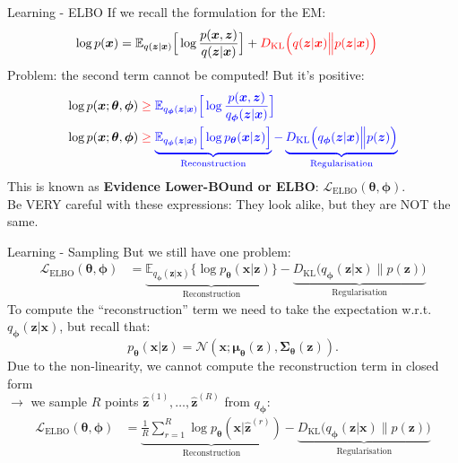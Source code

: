 \documentclass[aspectratio=169]{beamer}
\newcommand{\bs}[1]{\boldsymbol{#1}}
\begin{document}
\begin{frame}{Learning - ELBO}
 If we recall the formulation for the EM:
 \begin{align*}
\log p(\bs{x}) &= \mathbb{E}_{q(\bs{z}|\bs{x})}\Big[\log \frac{p(\bs{x},\bs{z})}{q(\bs{z}|\bs{x})}\Big] + {\color{red} D_{\text{KL}}\Big(q(\bs{z}|\bs{x})\Big\lVert p(\bs{z}|\bs{x})\Big)}
\end{align*}\pause
Problem: the second term cannot be computed! But it's positive:
 \begin{align*}
\log p(\bs{x};\bs{\theta},\bs{\phi}) &\; {\color{red}\geq}\; {\color{blue} \mathbb{E}_{q_{\bs{\phi}}(\bs{z}|\bs{x})}\Big[\log \frac{p(\bs{x},\bs{z})}{q_{\bs{\phi}}(\bs{z}|\bs{x})}\Big]} \\
\log p(\bs{x};\bs{\theta},\bs{\phi}) &\; {\color{red}\geq}\; {\color{blue} \underbrace{\mathbb{E}_{q_{\bs{\phi}}(\bs{z}|\bs{x})}\Big[\log p_{\bs{\theta}}(\bs{x}|\bs{z})\Big]}_{\text{Reconstruction}} -  \underbrace{D_{\text{KL}}\Big(q_{\bs{\phi}}(\bs{z}|\bs{x})\Big\lVert p(\bs{z})\Big)}_{\text{Regularisation}}}
\end{align*}
This is known as \textbf{Evidence Lower-BOund or ELBO}: $\mathcal{L}_{\text{ELBO}}(\bs{\theta},\bs{\phi})$.\vspace{3mm}\\
Be VERY careful with these expressions: They look alike, but they are NOT the same.
\end{frame}

\begin{frame}{Learning - Sampling}
 But we still have one problem:
 \begin{align*}
  \mathcal{L}_{\text{ELBO}}(\bs{\theta},\bs{\phi}) &= \underbrace{\mathbb{E}_{q_{\bs{\phi}}(\bs{z}|\bs{x})}\Big\{\log p_{\bs{\theta}}(\bs{x}|\bs{z})\Big\}}_{\text{Reconstruction}} -  \underbrace{D_{\text{KL}}\Big(q_{\bs{\phi}}(\bs{z}|\bs{x})\Big\lVert p(\bs{z})\Big)}_{\text{Regularisation}}
\end{align*}
To compute the ``reconstruction'' term we need to take the expectation w.r.t.\ $q_{\bs{\phi}}(\bs{z}|\bs{x})$, but recall that:
\begin{equation*}
  p_{\bs{\theta}}(\bs{x}|\bs{z}) = \mathcal{N}(\bs{x};\bs{\mu}_{\bs{\theta}}(\bs{z}),\bs{\Sigma}_{\bs{\theta}}(\bs{z})).
\end{equation*}
Due to the non-linearity, we cannot compute the reconstruction term in closed form\\ $\rightarrow$ we sample $R$ points $\hat{\bs{z}}^{(1)},\ldots,\hat{\bs{z}}^{(R)}$ from $q_{\bs{\phi}}$:
 \begin{align*}
  \mathcal{L}_{\text{ELBO}}(\bs{\theta},\bs{\phi}) &= \underbrace{\frac{1}{R}\sum_{r=1}^R\log p_{\bs{\theta}}(\bs{x}|\hat{\bs{z}}^{(r)})}_{\text{Reconstruction}} -  \underbrace{D_{\text{KL}}\Big(q_{\bs{\phi}}(\bs{z}|\bs{x})\Big\lVert p(\bs{z})\Big)}_{\text{Regularisation}}
\end{align*}
\end{frame}
\end{document}
